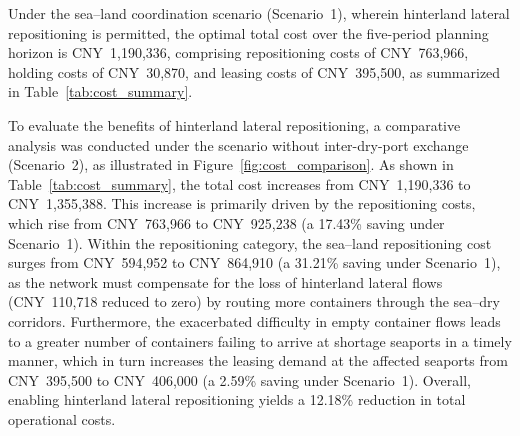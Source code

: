 \documentclass[preprint,12pt]{elsarticle}
\begin{document}
Under the sea–land coordination scenario (Scenario~1), wherein hinterland lateral repositioning is permitted, the optimal total cost over the five-period planning horizon is CNY~1,190,336, comprising repositioning costs of CNY~763,966, holding costs of CNY~30,870, and leasing costs of CNY~395,500, as summarized in Table~\ref{tab:cost_summary}.

To evaluate the benefits of hinterland lateral repositioning, a comparative analysis was conducted under the scenario without inter-dry-port exchange (Scenario~2), as illustrated in Figure~\ref{fig:cost_comparison}. As shown in Table~\ref{tab:cost_summary}, the total cost increases from CNY~1,190,336 to CNY~1,355,388. This increase is primarily driven by the repositioning costs, which rise from CNY~763,966 to CNY~925,238 (a 17.43\% saving under Scenario~1). Within the repositioning category, the sea--land repositioning cost surges from CNY~594,952 to CNY~864,910 (a 31.21\% saving under Scenario~1), as the network must compensate for the loss of hinterland lateral flows (CNY~110,718 reduced to zero) by routing more containers through the sea--dry corridors. Furthermore, the exacerbated difficulty in empty container flows leads to a greater number of containers failing to arrive at shortage seaports in a timely manner, which in turn increases the leasing demand at the affected seaports from CNY~395,500 to CNY~406,000 (a 2.59\% saving under Scenario~1). Overall, enabling hinterland lateral repositioning yields a 12.18\% reduction in total operational costs. 
\end{document}
